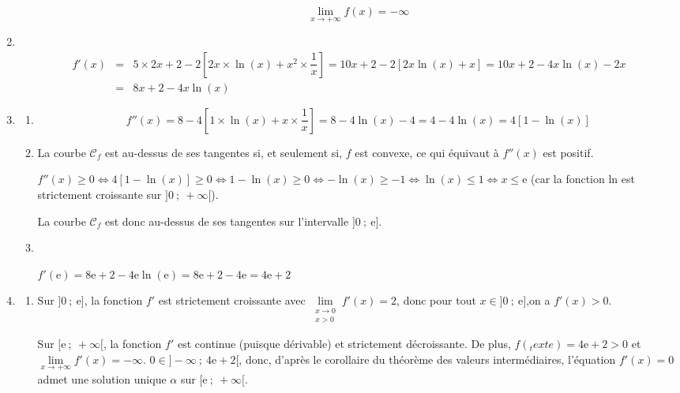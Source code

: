 \begin{enumerate}
\begin{enumerate}
		\[\boxed{\lim_{x \to +\infty}f(x) = -\infty}\]
	\end{enumerate}
	\item\
	\begin{eqnarray*}
		f'(x) &=& 5 \times 2x + 2 - 2 \left[ 2x \times \ln(x) + x^2 \times \dfrac{1}{x}\right] = 10x + 2 - 2\left[2x\ln(x) + x\right] = 10x + 2 - 4x\ln(x) - 2x\\
		&=& \boxed{8x + 2 - 4x\ln(x)}
	\end{eqnarray*}
	\item
	\begin{enumerate}
		\item
		\[f''(x) = 8 - 4\left[1 \times \ln(x) + x \times \dfrac{1}{x}\right] = 8 - 4\ln (x) - 4 = 4 - 4\ln(x) = \boxed{4\left[1-\ln(x)\right]}\]
		\item La courbe $\mathcal{C}_f$ est au-dessus de ses tangentes si, et seulement si, $f$ est convexe, ce qui équivaut à $f''(x)$ est positif.
		
		$f''(x) \geqslant 0 \iff 4\left[1-\ln(x)\right] \geqslant 0 \iff 1-\ln(x) \geqslant 0 \iff -\ln(x) \geqslant -1 \iff \ln(x) \leqslant 1 \iff x \leqslant \text{e}$ (car la fonction ln est strictement croissante sur $]0~;~+\infty[$).\\
		\smallskip
		
		La courbe $\mathcal{C}_f$ est donc au-dessus de ses tangentes sur l'intervalle $]0~;~\text{e}]$.
		\item\
		\begin{center}
		
		$f'(\text{e}) = 8\text{e} + 2 - 4\text{e} \ln(\text{e}) = 8\text{e} + 2 - 4\text{e} = 4\text{e} + 2$
		\end{center}
	\end{enumerate}
	\item
	\begin{enumerate}
		\item Sur $]0~;~\text{e}]$, la fonction $f'$ est strictement croissante avec $\lim\limits_{\substack{x \to 0\\x>0}}f'(x) = 2$, donc pour tout $x \in ]0~;~\text{e}]$,on a $f'(x) > 0$.\\
		\smallskip
		
		Sur $[\text{e}~;~+\infty[$, la fonction $f'$ est continue (puisque dérivable) et strictement décroissante. De plus, $f(_text{e}) = 4\text{e} + 2 > 0$ et $\lim\limits_{x \to +\infty}f'(x) = -\infty$. $0 \in ]-\infty~;~4\text{e}+2[$, donc, d'après le corollaire du théorème des valeurs intermédiaires, l'équation $f'(x) = 0$ admet une solution unique $\alpha$ sur $[\text{e}~;~+\infty[$.\\
		\smallskip
		

\end{enumerate}
\end{enumerate}
